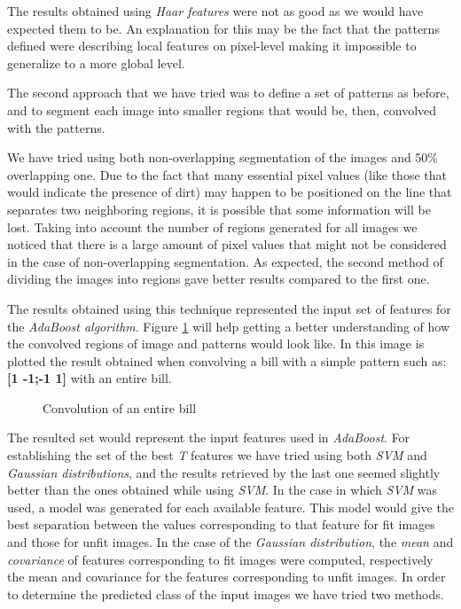 \documentclass[11pt,twocolumn]{article}
\begin{document}
			The results obtained using \emph{Haar features} were not as	good as we would have expected them to be. An explanation for this may be the fact that the patterns defined were describing local features on pixel-level making it impossible to generalize to a more global level.
			
			The second approach that we have tried was to define a set of patterns as before, and to segment each image into smaller regions that would be, then, convolved with the patterns.
			
			We have tried using both non-overlapping segmentation of the images and 50\% overlapping one. Due to the fact that many essential pixel values (like those that would indicate the presence of dirt) may happen to be positioned on the line that separates two neighboring regions, it is possible that some information will be lost. Taking into account the number of regions generated for all images we noticed that there is a large amount of pixel values that might not be considered in the case of non-overlapping segmentation. As expected, the second method of dividing the images into regions gave better results compared to the first one.

			The results obtained using this technique represented the input set of features for the \emph{AdaBoost algorithm}. Figure \ref{convolved} will help getting a better understanding of how the convolved regions of image and patterns would look like. In this image is plotted the result obtained when convolving a bill with a simple pattern such as: \textbf{[1 -1;-1 1]} with an entire bill.

			\begin{figure}[!hbtp]
				\centering
				\caption{Convolution of an entire bill}
				\label{convolved}
			\end{figure}

			The resulted set would represent the input features used in \emph{AdaBoost}. For establishing the set of the best \emph{T} features we have tried using both \emph{SVM} and \emph{Gaussian distributions}, and the results retrieved by the last one seemed slightly better than the ones obtained while using \emph{SVM}. In the case in which \emph{SVM} was used, a model was generated for each available feature. This model would give the best separation between the values corresponding to that feature for fit images and those for unfit images. In the case of the \emph{Gaussian distribution}, the \emph{mean} and \emph{covariance} of features corresponding to fit images were computed, respectively the mean and covariance for the features corresponding to unfit images. In order to determine the predicted class of the input images we have tried two methods.
\end{document}
